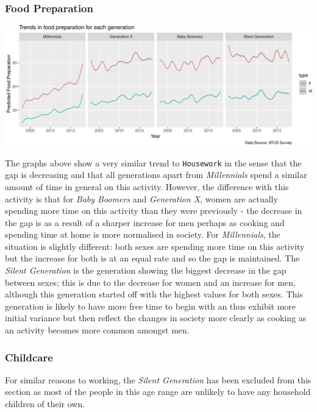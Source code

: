 \documentclass[11pt,]{article}
\begin{document}
\hypertarget{food-preparation}{%
\subsubsection{Food Preparation}\label{food-preparation}}

\includegraphics{Final-Report_files/figure-latex/unnamed-chunk-6-1}

The graphs above show a very similar trend to \texttt{Housework} in the
sense that the gap is decreasing and that all generations apart from
\emph{Millennials} spend a similar amount of time in general on this
activity. However, the difference with this activity is that for
\emph{Baby Boomers} and \emph{Generation X}, women are actually spending
more time on this activity than they were previously - the decrease in
the gap is as a result of a sharper increase for men perhaps as cooking
and spending time at home is more normalised in society. For
\emph{Millennials}, the situation is slightly different: both sexes are
spending more time on this activity but the increase for both is at an
equal rate and so the gap is maintained. The \emph{Silent Generation} is
the generation showing the biggest decrease in the gap between sexes;
this is due to the decrease for women and an increase for men, although
this generation started off with the highest values for both sexes. This
generation is likely to have more free time to begin with an thus
exhibit more initial variance but then reflect the changes in society
more clearly as cooking as an activity becomes more common amongst men.

\hypertarget{childcare}{%
\subsubsection{Childcare}\label{childcare}}

For similar reasons to working, the \emph{Silent Generation} has been
excluded from this section as most of the people in this age range are
unlikely to have any household children of their own.
\end{document}
